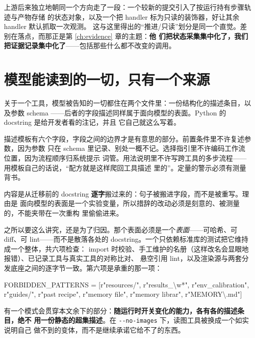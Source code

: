 \documentclass[11pt,a4paper,UTF8,fontset=macnew]{ctexrep}
\begin{document}
上游后来独立地朝同一个方向走了一段：一个较新的提交引入了按运行持有步骤轨迹与产物存储
的状态对象，以及一个把 handler 标为只读的装饰器，好让其余 handler 默认抓取一次观测。
这与这里得出的“推进/只读”划分是同一个直觉。差别在落点，而那正是第 \ref{ch:evidence} 章的主题：\textbf{他
们把状态采集集中化了，我们把证据记录集中化了}——包括那些什么都不改变的调用。

\chapter{模型能读到的一切，只有一个来源}

关于一个工具，模型被告知的一切都住在两个文件里：一份结构化的描述条目，以及参数 schema
——后者的字段描述同样属于面向模型的表面。Python 的 docstring 是给开发者看的注记，并且
它自己就这么写着。

描述模板有六个字段，字段之间的边界才是有意思的部分。前置条件里不许复述参数，因为参数
只在 schema 里记录、别处一概不记。选择指引里不许编码工作流位置，因为流程顺序归系统提示
词管。用法说明里不许写跨工具的多步流程——用模板自己的话说，“配方就是这样爬回工具描述
里的”。定量的警示必须有测量背书。

内容是从迁移前的 docstring \textbf{逐字}搬过来的：句子被搬进字段，而不是被重写。理由是
面向模型的表面是一个实验变量，所以措辞的改动必须是刻意的、被测量的，不能夹带在一次重构
里偷偷进来。

之所以要这么讲究，还是为了归因。那个表面必须是一个\emph{表面}——可哈希、可 diff、可
lint——而不是散落各处的 docstring。一个只依赖标准库的测试把它维持成一个整体，共六项检查：
import 时校验、手工维护的名册（这样改名会显眼地报错）、已记录工具与真实工具的对称比对、
悬空引用 lint，以及渲染源与两套分发底座之间的逐字节一致。第六项是承重的那一项：

\begin{evidence}[title={先验泄漏 lint，跑在模型真正看到的渲染字节上}]
\ttfamily\footnotesize
FORBIDDEN\_PATTERNS = [r"resources/", r"results\_\textbackslash w*", r"env\_calibration",\\
\hspace*{6em} r"guides/", r"past recipe", r"memory file", r"memory librar", r"MEMORY\textbackslash .md"]
\end{evidence}

\noindent
有一个模式会贯穿本文余下的部分：\textbf{随运行时开关变化的能力，各有各的描述条目，绝不
用一份静态的超集描述}。在 \texttt{-{}-no-images} 下，读图工具被换成一个如实说明自己
做不到的变体，而不是继续承诺它给不了的东西。
\end{document}

